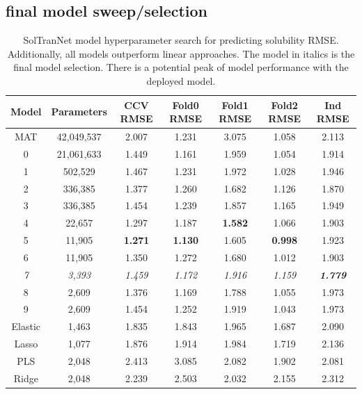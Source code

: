 \documentclass[journal=jmcmar,manuscript=article]{achemso}
\begin{document}
\subsection{final model sweep/selection}
\begin{table}
    \begin{tabular}{|c|c|c|c|c|c|c|}
        \hline
         Model & Parameters & CCV RMSE & Fold0 RMSE & Fold1 RMSE & Fold2 RMSE & Ind RMSE \\
         \hline
         MAT & 42,049,537 & 2.007 & 1.231 & 3.075 & 1.058 & 2.113  \\
         \hline
         0 & 21,061,633 & 1.449 & 1.161 & 1.959 & 1.054 & 1.914 \\
         1 & 502,529 & 1.467 & 1.231 & 1.972 & 1.028 & 1.946 \\
         2 & 336,385 & 1.377 & 1.260 & 1.682 & 1.126 & 1.870 \\
         3 & 336,385 & 1.454 & 1.239 & 1.857 & 1.165 & 1.949 \\
         4 & 22,657 & 1.297 & 1.187 & \textbf{1.582} & 1.066 & 1.903 \\
         5 & 11,905 & \textbf{1.271} & \textbf{1.130} & 1.605 & \textbf{0.998} & 1.923 \\
         6 & 11,905 & 1.350 & 1.272 & 1.680 & 1.012 & 1.903\\
         \emph{7} & \emph{3,393} & \emph{1.459} & \emph{1.172} & \emph{1.916} & \emph{1.159} & \emph{\textbf{1.779}}\\
         8 & 2,609 & 1.376 & 1.169 & 1.788 & 1.055  & 1.973 \\
         9 & 2,609 & 1.454 & 1.252 & 1.919 & 1.043  & 1.973 \\
         \hline
         Elastic & 1,463 & 1.835 & 1.843 & 1.965 & 1.687  & 2.090\\
         Lasso & 1,077 & 1.876 & 1.914 & 1.984 & 1.719 & 2.136\\
         PLS & 2,048 & 2.413 & 3.085 & 2.082 & 1.902 & 2.081\\
         Ridge & 2,048 & 2.239 & 2.503 & 2.032 & 2.155 & 2.312 \\
         \hline
    \end{tabular}
    \caption{SolTranNet model hyperparameter search for predicting solubility RMSE. Additionally, all models outperform linear approaches. The model in italics is the final model selection. There is a potential peak of model performance with the deployed model.}
    \label{tab:solsearchrmse}
\end{table}
\end{document}

